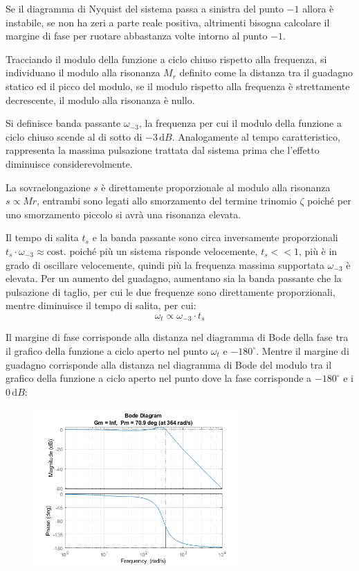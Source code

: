 \documentclass{article}
\numberwithin{equation}{subsection}
\newcommand{\df}{\mathrm{d}}
\begin{document}
Se il diagramma di Nyquist del sistema passa a sinistra del punto $-1$ allora è instabile, se non ha zeri a parte reale positiva, altrimenti bisogna calcolare il margine di fase per ruotare abbastanza 
volte intorno al punto $-1$.



Tracciando il modulo della funzione a ciclo chiuso rispetto alla frequenza, si individuano il modulo alla risonanza $M_r$ definito come la distanza tra il guadagno statico 
ed il picco del modulo, se il modulo rispetto alla frequenza è strettamente decrescente, il modulo alla risonanza è nullo. 



Si definisce banda passante $\omega_{-3}$, la 
frequenza per cui il modulo della funzione a ciclo chiuso scende al di sotto di $-3\,\df B$. Analogamente al tempo caratteristico, rappresenta la massima pulsazione trattata dal 
sistema prima che l'effetto diminuisce considerevolmente. 



La sovraelongazione $s$ è direttamente proporzionale al modulo alla risonanza $s\propto Mr$, entrambi sono legati allo smorzamento del termine trinomio $\zeta$ poiché per uno 
smorzamento piccolo si avrà una risonanza elevata.



Il tempo di salita $t_s$ e la banda passante sono circa inversamente proporzionali 
$t_s\cdot\omega_{-3}\approx \mathrm{cost.}$ poiché più un sistema risponde velocemente, $t_s<<1$, più è in grado di oscillare velocemente, quindi più la frequenza massima supportata 
$\omega_{-3}$ è elevata. 
Per un aumento del guadagno, aumentano sia la banda passante che la pulsazione di taglio, per cui le due frequenze sono direttamente proporzionali, 
mentre diminuisce il tempo di salita, per cui:
\begin{equation}
    \omega_t\propto\omega_{-3}\cdot t_s
\end{equation}



Il margine di fase corrisponde alla distanza nel diagramma di Bode della fase tra il grafico della funzione a ciclo aperto nel punto $\omega_t$ e $-180^{\circ}$. 
Mentre il margine di guadagno corrisponde alla distanza nel diagramma di Bode del modulo tra il grafico della funzione a ciclo aperto nel punto dove la fase corrisponde 
a $-180^{\circ}$ e i $0\,\df B$: 

\begin{figure}[H]%
    \centering
    \includegraphics[width=8cm]{Bode3.png}%
\end{figure}
\end{document}
